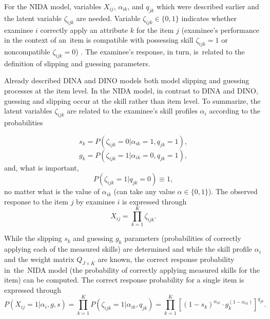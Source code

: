 \documentclass[english]{pwr_wmat_praca_dyplomowa}
\theoremstyle{plain}
\numberwithin{theorem}{chapter}
\theoremstyle{definition}
\numberwithin{theorem}{chapter}
\begin{document}
	For the NIDA model, variables $X_{ij}$, $\alpha_{ik}$, and $q_{jk}$ which were described earlier and the latent variable $\zeta_{ijk}$ are needed. Variable $\zeta_{ijk} \in \{0,1\}$ indicates whether examinee $i$ correctly apply an attribute $k$ for the item $j$ (examinee's performance in the context of an~item is compatible with possessing skill $\zeta_{ijk}=1$ or noncompatible $\zeta_{ijk}=0$) \cite{book_tables}. The examinee's response, in turn, is~related to the definition of slipping and guessing parameters.
	
	Already described DINA and DINO models both model slipping and guessing processes at the item level. In the NIDA model, in contrast to DINA and DINO, guessing and slipping occur at the skill rather than item level. To summarize, the latent variables $\zeta_{ijk}$ are related to the examinee's skill profiles $\alpha_{i}$ according to the probabilities
	
	\begin{equation}
	s_k = P(\zeta_{ijk} = 0 | \alpha_{ik} = 1, q_{jk} = 1),
	\end{equation}
	\begin{equation}
	g_k = P(\zeta_{ijk} = 1 | \alpha_{ik} = 0, q_{jk} = 1),
	\end{equation}
	and, what is important,
	\begin{equation}
	P(\zeta_{ijk} = 1 | q_{jk} = 0) \equiv 1,
	\end{equation}
	no matter what is the value of $\alpha_{ik}$ (can take any value $\alpha \in \{0,1\}$). The observed response to the item $j$ by examinee $i$ is expressed through
	\begin{equation}
	X_{ij} = \prod\limits_{k=1}^{K} \zeta_{ijk}.
	\end{equation}
	
	\noindent While the slipping $s_k$ and guessing $g_k$ parameters (probabilities of correctly applying each of the measured skills) are determined and while the skill profile $\alpha_{i}$ and the weight matrix $Q_{J\times K}$ are known, the correct response probability in~the~NIDA model (the probability of correctly applying measured skills for the item) can be computed. The correct response probability for a single item is expressed through 
	\begin{equation}
	P(X_{ij} = 1 | \alpha_i, g, s) = \prod\limits_{k=1}^{K} P(\zeta_{ijk} = 1 | \alpha_{ik}, q_{jk}) = \prod\limits_{k=1}^{K} \left[ (1-s_k)^{\alpha_{ik}} \cdot g_k^{(1-\alpha_{ik})} \right] ^{q_{jk}}.
	\end{equation}
	
\end{document}

